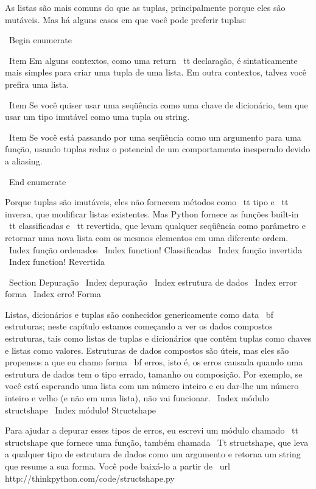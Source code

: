 \documentclass[10pt]{book}
\begin{document}
\begin {itemize}
{{{{{{{{{As listas são mais comuns do que as tuplas, principalmente porque eles são mutáveis.
Mas há alguns casos em que você pode preferir tuplas:

\ Begin {enumerate}

\ Item Em alguns contextos, como uma {return \ tt} declaração, é
sintaticamente mais simples para criar uma tupla de uma lista. Em outra
contextos, talvez você prefira uma lista.

\ Item Se você quiser usar uma seqüência como uma chave de dicionário,
tem que usar um tipo imutável como uma tupla ou string.

\ Item Se você está passando por uma seqüência como um argumento para uma função,
usando tuplas reduz o potencial de um comportamento inesperado
devido a aliasing.

\ End {enumerate}

Porque tuplas são imutáveis, eles não fornecem métodos
como {\ tt tipo} e {\ tt inversa}, que modificar listas existentes.
Mas Python fornece as funções built-in {\ tt classificadas}
e {\ tt revertida}, que levam qualquer seqüência como parâmetro
e retornar uma nova lista com os mesmos elementos em uma diferente
ordem.
\ Index {função ordenados}
\ Index {function! Classificadas}
\ Index {função invertida}
\ Index {function! Revertida}


\ Section {} Depuração
\ Index {depuração}
\ Index {estrutura de dados}
\ Index {error forma}
\ Index {erro! Forma}

Listas, dicionários e tuplas são conhecidos genericamente como {data \ bf
  estruturas}; neste capítulo estamos começando a ver os dados compostos
estruturas, tais como listas de tuplas e dicionários que contêm tuplas
como chaves e listas como valores. Estruturas de dados compostos são úteis, mas
eles são propensos a que eu chamo {forma \ bf erros}, isto é, os erros
causada quando uma estrutura de dados tem o tipo errado, tamanho ou composição.
Por exemplo, se você está esperando uma lista com um número inteiro e eu
dar-lhe um número inteiro e velho (e não em uma lista), não vai funcionar.
\ Index {módulo structshape}
\ Index {módulo! Structshape}


Para ajudar a depurar esses tipos de erros, eu escrevi um módulo
chamado {\ tt structshape} que fornece uma função, também chamada
{\ Tt structshape}, que leva a qualquer tipo de estrutura de dados como
um argumento e retorna um string que resume a sua forma.
Você pode baixá-lo a partir de \ url {http://thinkpython.com/code/structshape.py}

}}}}}}}}}
\end{itemize}
\end{document}
